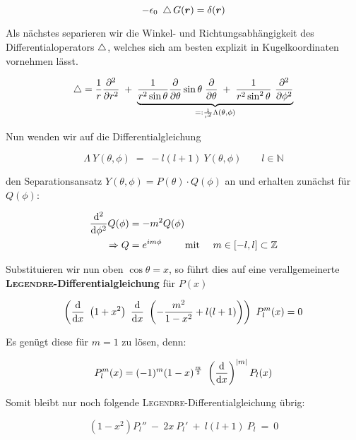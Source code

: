\begin{equation*}
-\epsilon_0 \ \mathop{{}\bigtriangleup}\nolimits G(\bm{r}) = \delta(\bm{r})
\end{equation*}

Als nächstes separieren wir die Winkel- und Richtungsabhängigkeit des Differentialoperators $\mathop{{}\bigtriangleup}\nolimits$, welches sich am besten explizit in Kugelkoordinaten vornehmen lässt.

\begin{equation*}
\laplace = \frac{1}{r} \pddiff{}{r}  \; +\; \underbrace{\frac{1}{r^2 \sin\theta} \pdiff{}{\theta} \sin\theta \; \pdiff{}{\theta} \; + \; \frac{1}{r^2 \sin^2\theta} \ \pddiff{}{\phi}}_{=: \frac{1}{r^2}\Lambda(\theta,\phi)}
\end{equation*}

Nun wenden wir auf die Differentialgleichung

\begin{equation*}
\Lambda \ Y(\theta,\phi) \; = \; -l(l+1) \ Y(\theta,\phi) \qquad l \in \mathbb{N}
\end{equation*}

den Separationsansatz $Y(\theta,\phi) = P(\theta)\cdot Q(\phi)$ an und erhalten zunächst für $Q(\phi)$:

\begin{align*}
\frac{\mathrm{d}^2{}}{\mathrm{d}{\phi}^2}Q(\phi) &= - m^2 Q(\phi)\\
\Rightarrow Q &= e^{im\phi} \qquad \text{ mit } \quad m \in [-l,l] \subset \mathbb{Z}
\end{align*}

Substituieren wir nun oben $\cos\theta = x$, so führt dies auf eine verallgemeinerte \textbf{\textsc{Legendre}-Differentialgleichung} für $P(x)$

\begin{equation*}
\left(\diff{}{x} \ \left(1+x^2\right) \ \diff{}{x} \ \left(-\frac{m^2}{1-x^2} + l(l+1)\right)\right) \ P_l^m(x) = 0
\end{equation*}

Es genügt diese für $m=1$ zu lösen, denn:

\begin{equation*}
P_l^m(x) = (-1)^m(1-x)^{\frac{m}{2}} \ \left(\diff{}{x}\right)^{|m|} P_l(x)
\end{equation*}

Somit bleibt nur noch folgende \textsc{Legendre}-Differentialgleichung übrig:

\begin{equation*}
(1-x^2) P_l'' \ - \ 2x \ P_l' \ + \ l(l+1) \ P_l \ = \ 0
\end{equation*}

